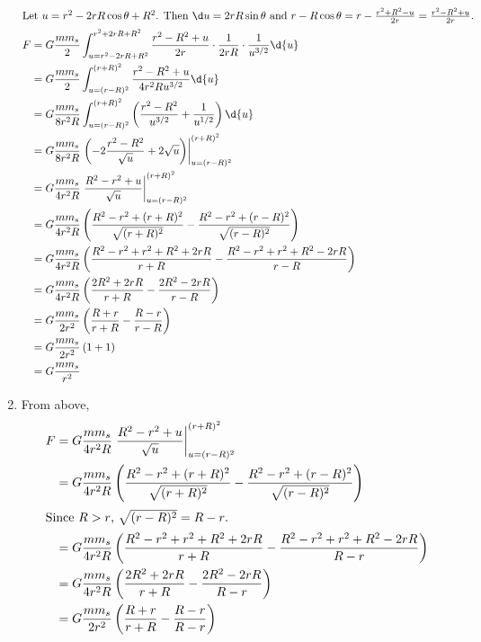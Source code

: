 \documentclass{esg8012pset}
\begin{document}
\begin{solution}
\begin{enumerate}[1)]
\begin{align*}
    \intertext{Let $u=r^2-2rR\cos\theta + R^2$.  Then $\d u = 2rR\sin\theta$ and $r-R\cos\theta = r - \frac{r^2 + R^2 - u}{2r} = \frac{r^2 - R^2 + u}{2r}$.}
    F & = G \frac{m m_s}{2} \int_{u = r^2-2rR+R^2}^{r^2+2rR+R^2} \frac{r^2 - R^2 + u}{2r} \cdot \frac{1}{2rR} \cdot  \frac{1}{u^{3/2}} \d{u} \\
     & = G \frac{m m_s}{2} \int_{u = (r-R)^2}^{(r+R)^2} \frac{r^2 - R^2 + u}{4r^2Ru^{3/2}} \d{u} \\
     & = G \frac{m m_s}{8r^2R} \int_{u = (r-R)^2}^{(r+R)^2} \left(\frac{r^2 - R^2}{u^{3/2}} + \frac{1}{u^{1/2}}\right) \d{u} \\
     & = G \frac{m m_s}{8r^2R} \left.\left(-2\frac{r^2 - R^2}{\sqrt{u}} + 2\sqrt{u}\right)\right|_{u = (r-R)^2}^{(r+R)^2} \\
     & = G \frac{m m_s}{4r^2R} \left.\frac{R^2 - r^2 + u}{\sqrt{u}}\right|_{u = (r-R)^2}^{(r+R)^2} \\
     & = G \frac{m m_s}{4r^2R} \left(\frac{R^2 - r^2 + (r+R)^2}{\sqrt{(r+R)^2}} - \frac{R^2 - r^2 + (r-R)^2}{\sqrt{(r-R)^2}}\right) \\
     & = G \frac{m m_s}{4r^2R} \left(\frac{R^2 - r^2 + r^2 + R^2 + 2rR}{r+R} - \frac{R^2 - r^2 + r^2 + R^2 -2rR}{r-R}\right) \\
     & = G \frac{m m_s}{4r^2R} \left(\frac{2R^2 + 2rR}{r+R} - \frac{2R^2 - 2rR}{r-R}\right) \\
     & = G \frac{m m_s}{2r^2} \left(\frac{R + r}{r+R} - \frac{R - r}{r-R}\right) \\
     & = G \frac{m m_s}{2r^2} \left(1 + 1\right) \\
     & = G \frac{m m_s}{r^2}
    \end{align*}
    \item From above, \begin{align*}
     F & = G \frac{m m_s}{4r^2R} \left.\frac{R^2 - r^2 + u}{\sqrt{u}}\right|_{u = (r-R)^2}^{(r+R)^2} \\
     & = G \frac{m m_s}{4r^2R} \left(\frac{R^2 - r^2 + (r+R)^2}{\sqrt{(r+R)^2}} - \frac{R^2 - r^2 + (r-R)^2}{\sqrt{(r-R)^2}}\right) \\
     \intertext{Since $R>r$, $\sqrt{(r-R)^2} = R - r$.}
     & = G \frac{m m_s}{4r^2R} \left(\frac{R^2 - r^2 + r^2 + R^2 + 2rR}{r+R} - \frac{R^2 - r^2 + r^2 + R^2 -2rR}{R - r}\right) \\
     & = G \frac{m m_s}{4r^2R} \left(\frac{2R^2 + 2rR}{r+R} - \frac{2R^2 - 2rR}{R - r}\right) \\
     & = G \frac{m m_s}{2r^2} \left(\frac{R + r}{r+R} - \frac{R - r}{R - r}\right) \\

\end{align*}
\end{enumerate}
\end{solution}
\end{document}
